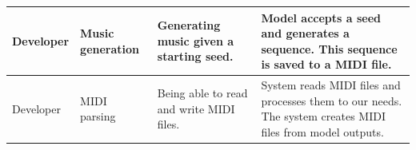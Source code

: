 \documentclass[a4paper, 11pt, twoside]{report}
\theoremstyle{definition}
\begin{document}
\begin{longtable}{ |S{0.12\textwidth}|S{0.15\textwidth}|S{0.25\textwidth}|S{0.37\textwidth}| }
    \setlength{\baselineskip}{16pt}Developer & \setlength{\baselineskip}{16pt}Music generation    & \setlength{\baselineskip}{16pt}Generating music given a starting seed.     & \setlength{\baselineskip}{16pt}Model accepts a seed and generates a sequence. This sequence is saved to a MIDI file.                                                                                                                          \\ \hline
    \setlength{\baselineskip}{16pt}Developer & \setlength{\baselineskip}{16pt}MIDI parsing        & \setlength{\baselineskip}{16pt}Being able to read and write MIDI files.    & \setlength{\baselineskip}{16pt}System reads MIDI files and processes them to our needs. The system creates MIDI files from model outputs.                                                                                                     \\ \hline


\end{longtable}
\end{document}
